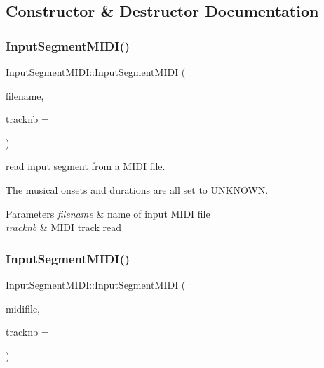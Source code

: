 \subsection{Constructor \& Destructor Documentation}
\mbox{\label{classInputSegmentMIDI_a8ae9a7a113d9b3fec0643cf8773a69df}} 
\subsubsection{\texorpdfstring{InputSegmentMIDI()}{InputSegmentMIDI()}\hspace{0.1cm}{\footnotesize\ttfamily [1/3]}}
{\footnotesize\ttfamily Input\+Segment\+M\+I\+D\+I\+::\+Input\+Segment\+M\+I\+DI (\begin{DoxyParamCaption}\item[{const std\+::string}]{filename,  }\item[{int}]{tracknb = {} }\end{DoxyParamCaption})}



read input segment from a M\+I\+DI file. 

The musical onsets and durations are all set to U\+N\+K\+N\+O\+WN. 
\begin{DoxyParams}{Parameters}
{\em filename} & name of input M\+I\+DI file \\
\hline
{\em tracknb} & M\+I\+DI track read \\
\hline
\end{DoxyParams}
\mbox{\label{classInputSegmentMIDI_ad337626161ab1a2ff80a4d845421a9f6}} 
\subsubsection{\texorpdfstring{InputSegmentMIDI()}{InputSegmentMIDI()}\hspace{0.1cm}{\footnotesize\ttfamily [2/3]}}
{\footnotesize\ttfamily Input\+Segment\+M\+I\+D\+I\+::\+Input\+Segment\+M\+I\+DI (\begin{DoxyParamCaption}\item[{Midi\+File \&}]{midifile,  }\item[{int}]{tracknb = {} }\end{DoxyParamCaption})}



